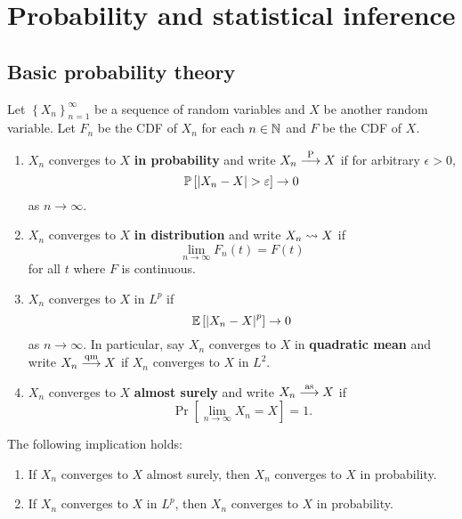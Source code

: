 \documentclass[a4paper]{article}
\begin{document}
\maketitle

\tableofcontents

\section{Probability and statistical inference}

\subsection{Basic probability theory}
\begin{defi}
Let $\left\{ X_n \right\}_{n=1}^\infty$ be a sequence of random
variables and $X$ be another random variable. Let
$F_n$ be the CDF of $X_n$ for each $n \in \mathbb{N}$ and $F$
be the CDF of $X$.
\begin{enumerate}
  \item $X_n$ converges to $X$ \textbf{in probability}
  and write $X_n \overset{\mathrm{P}}{\longrightarrow} X$ if for arbitrary
  $\epsilon > 0$,
  \[
  \mathbb{P} \left[ \left\lvert X_n - X\right\rvert > \varepsilon \right] \to 0
  \]
  as $n \to \infty$.

  \item $X_n$ converges to $X$ \textbf{in distribution} and
  write $X_n \rightsquigarrow X$ if
  \[
  \lim_{n \to \infty} F_n(t) = F(t)
  \]
  for all $t$ where $F$ is continuous.

  \item $X_n$ converges to $X$ in $L^p$ if
  \[
  \mathbb{E} \left[ \left\lvert X_n - X\right\rvert^p \right] \to 0
  \]
  as $n \to \infty$. In particular, say $X_n$ converges to
  $X$ in \textbf{quadratic mean} and write $X_n \overset{\mathrm{qm}}{\longrightarrow} X$
  if $X_n$ converges to $X$ in $L^2$.

  \item $X_n$ converges to $X$ \textbf{almost surely}
  and write $X_n \overset{\mathrm{as}}{\longrightarrow} X$ if
  \[
  \Pr \left[ \lim_{n \to \infty} X_n =  X \right] = 1.
  \]
\end{enumerate}
\end{defi}

\begin{thm}
The following implication holds:
\begin{enumerate}
  \item If $X_n$ converges to $X$ almost surely,
  then $X_n$ converges to $X$ in probability.

  \item If $X_n$ converges to $X$ in $L^p$, then
  $X_n$ converges to $X$ in probability.
\end{enumerate}
\end{thm}
\end{document}
